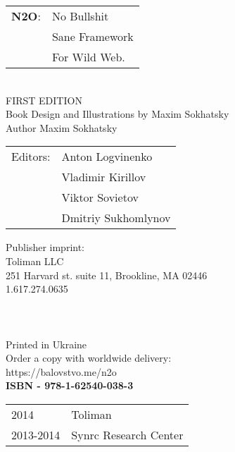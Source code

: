 \begingroup
{}
\parindent 0pt
\baselineskip

\begin{tabular}{ll}
{\bf N2O}: & No Bullshit \\
    & Sane Framework \\
    & For Wild Web. \\
\end{tabular}
\\

FIRST EDITION \\

Book Design and Illustrations by Maxim Sokhatsky \\
Author Maxim Sokhatsky \\

\begin{tabular}{ll}
Editors: & Anton Logvinenko \\
         & Vladimir Kirillov \\
         & Viktor Sovietov \\
         & Dmitriy Sukhomlynov \\
\end{tabular}

Publisher imprint: \\
Toliman LLC \\
251 Harvard st. suite 11, Brookline, MA 02446 \\
1.617.274.0635 \\
\\
\\
\\




Printed in Ukraine \\

Order a copy with worldwide delivery: \\
https://balovstvo.me/n2o \\

{\bf  ISBN - 978-1-62540-038-3\hspace{2em}}

\begin{tabular}{ll}
\textcopyright{} 2014 & Toliman \\
\textcopyright{} 2013-2014 & Synrc Research Center
\end{tabular}

\endgroup

   \thispagestyle{empty}
 